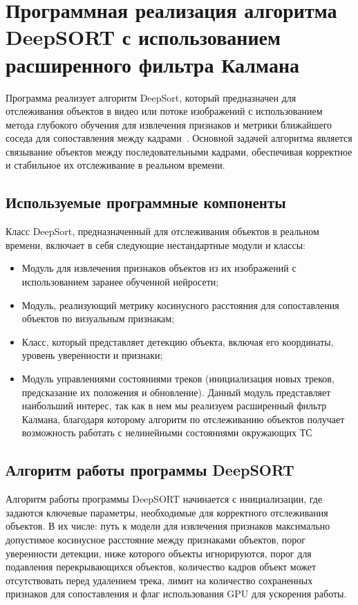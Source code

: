 \section{Программная реализация алгоритма DeepSORT с использованием расширенного фильтра Калмана}

Программа реализует алгоритм DeepSort, который предназначен для отслеживания объектов в видео или потоке изображений с использованием метода глубокого обучения для извлечения признаков и метрики ближайшего соседа для сопоставления между кадрами~\cite{Sun2006}. Основной задачей алгоритма является связывание объектов между последовательными кадрами, обеспечивая корректное и стабильное их отслеживание в реальном времени.

\subsection{Используемые программные компоненты}

Класс DeepSort, предназначенный для отслеживания объектов в реальном времени, включает в себя следующие нестандартные модули и классы:

\begin{itemize}
    \item Модуль для извлечения признаков объектов из их изображений с использованием заранее обученной нейросети;
    \item Модуль, реализующий метрику косинусного расстояния для сопоставления объектов по визуальным признакам;
    \item Класс, который представляет детекцию объекта, включая его координаты, уровень уверенности и признаки;
    \item Модуль управлениями состояниями треков (инициализация новых треков, предсказание их положения и обновление). Данный модуль представляет наибольший интерес, так как в нем мы реализуем расширенный фильтр Калмана, благодаря которому алгоритм по отслеживанию объектов получает возможность работать с нелинейными состояниями окружающих ТС
\end{itemize}

\subsection{Алгоритм работы программы DeepSORT}

Алгоритм работы программы DeepSORT начинается с инициализации, где задаются ключевые параметры, необходимые для корректного отслеживания объектов. В их числе: путь к модели для извлечения признаков максимально допустимое косинусное расстояние между признаками объектов, порог уверенности детекции, ниже которого объекты игнорируются, порог для подавления перекрывающихся объектов, количество кадров объект может отсутствовать перед удалением трека, лимит на количество сохраненных признаков для сопоставления и флаг использования GPU для ускорения работы.

